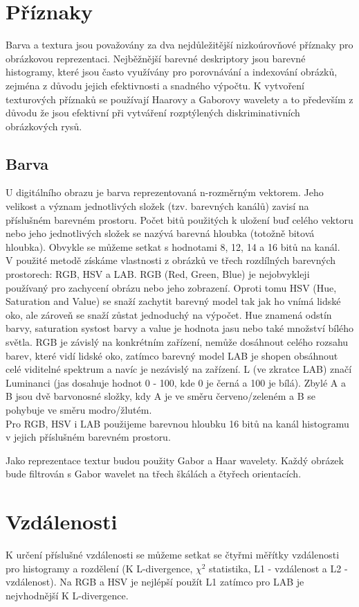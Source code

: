 \documentclass[czech,BP]{thesiskiv}
\begin{document}
\section{Příznaky}
Barva a textura jsou považovány za dva nejdůležitější nizkoúrovňové příznaky pro obrázkovou reprezentaci. Nejběžnější barevné deskriptory jsou barevné histogramy, které jsou často využívány pro porovnávání a indexování obrázků, zejména z důvodu jejich efektivnosti a snadného výpočtu. K vytvoření texturových příznaků se používají Haarovy a Gaborovy wavelety a to především z důvodu že jsou efektivní při vytváření rozptýlených diskriminativních obrázkových rysů.  
\\
\subsection{Barva}
U digitálního obrazu je barva reprezentovaná n-rozměrným vektorem. Jeho velikost a význam jednotlivých složek (tzv. barevných kanálů) zavisí na příslušném barevném prostoru. Počet bitů použitých k uložení buď celého vektoru nebo jeho jednotlivých složek se nazývá barevná hloubka (totožně bitová hloubka). Obvykle se můžeme setkat s hodnotami 8, 12, 14 a 16 bitů na kanál. 
\\
V použité metodě získáme vlastnosti z obrázků ve třech rozdílných barevných prostorech: RGB, HSV a LAB. RGB (Red, Green, Blue) je nejobvykleji používaný pro zachycení obrázu nebo jeho zobrazení. Oproti tomu HSV (Hue, Saturation and Value) se snaží zachytit barevný model tak jak ho vnímá lidské oko, ale zároveň se snaží zůstat jednoduchý na výpočet. Hue znamená odstín barvy, saturation systost barvy a value je hodnota jasu nebo také množství bílého světla. RGB je závislý na konkrétním zařízení, nemůže dosáhnout celého rozsahu barev, které vidí lidské oko, zatímco barevný model LAB je shopen obsáhnout celé viditelné spektrum a navíc je nezávislý na zařízení. L (ve zkratce LAB) značí Luminanci (jas dosahuje hodnot 0 - 100, kde 0 je černá a 100 je bílá). Zbylé A a B jsou dvě barvonosné složky, kdy A je ve směru červeno/zeleném a B se pohybuje ve směru modro/žlutém. 
\\

Pro RGB, HSV i LAB použijeme barevnou hloubku 16 bitů na kanál histogramu v jejich příslušném barevném prostoru. 

Jako reprezentace textur budou použity Gabor a Haar wavelety. Každý obrázek bude filtrován s Gabor wavelet na třech škálách a čtyřech orientacích. 

\section{Vzdálenosti}
 K určení příslušné vzdálenosti se můžeme setkat se čtyřmi měřítky vzdálenosti pro histogramy a rozdělení (K L-divergence, $\chi^2$ statistika, L1 - vzdálenost a L2 - vzdálenost). Na RGB a HSV je nejlépší použít L1 zatímco pro LAB je nejvhodnější K L-divergence. 
 
\end{document}
